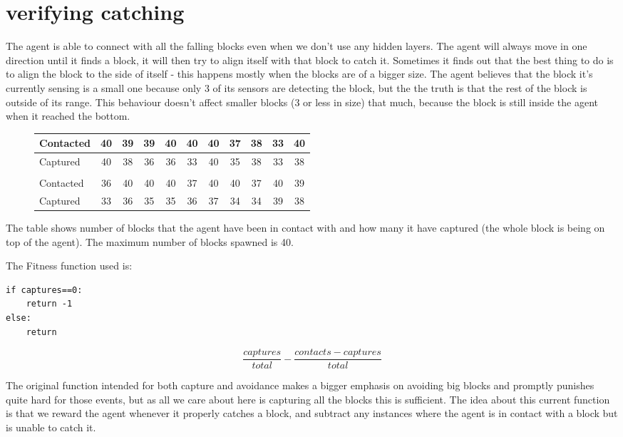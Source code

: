 \documentclass[12pt, a4paper]{article}
\begin{document}
\section{verifying catching}

The agent is able to connect with all the falling blocks even when we don't use any hidden layers. The agent will always move in one direction until it finds a block, it will then try to align itself with that block to catch it. Sometimes it finds out that the best thing to do is to align the block to the side of itself - this happens mostly when the blocks are of a bigger size. The agent believes that the block it's currently sensing is a small one because only 3 of its sensors are detecting the block, but the the truth is that the rest of the block is outside of its range. This behaviour doesn't affect smaller blocks (3 or less in size) that much, because the block is still inside the agent when it reached the bottom.

\begin{figure}[H]
	\begin{center}
		\begin{tabular}{l | c | c |c |c |c |c |c |c|c|c}
		 Contacted& 40&39&39&40&40&40&37&38&33&40\\ \hline
		 Captured & 40&38&36&36&33&40&35&38&33&38\\
		 \\
		 Contacted &36&40&40&40&37&40&40&37&40&39\\ \hline
		 Captured &33&36&35&35&36&37&34&34&39&38\\

		\end{tabular}
	\end{center}
\end{figure}
The table shows number of blocks that the agent have been in contact with and how many it have captured (the whole block is being on top of the agent). The maximum number of blocks spawned is 40.

The Fitness function used is: 
\begin{verbatim}
if captures==0:
    return -1
else:
    return
	\end{verbatim}
    $$\frac{captures}{total}-\frac{contacts-captures}{total}$$

The original function intended for both capture and avoidance makes a bigger emphasis on avoiding big blocks and promptly punishes quite hard for those events, but as all we care about here is capturing all the blocks this is sufficient. The idea about this current function is that we reward the agent whenever it properly catches a block, and subtract any instances where the agent is in contact with a block but is unable to catch it. 
\end{document}
